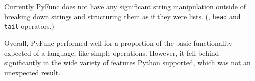 \documentclass{l4proj}
\begin{document}
    Currently PyFunc does not have any significant string manipulation outside of breaking down strings and structuring them as if they were lists. (\text{::}, \texttt{head} and \texttt{tail} operators.)


Overall, PyFunc performed well for a proportion of the basic functionality expected of a language, like simple operations.
However, it fell behind significantly in the wide variety of features Python supported, which was not an unexpected result.








\end{document}
